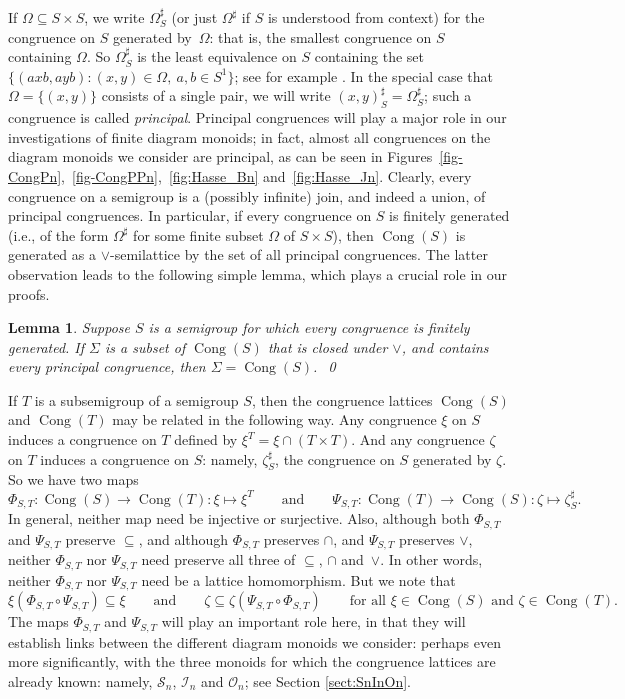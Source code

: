\documentclass[11pt,a4paper]{article}
\renewcommand{\O}{\mathcal O}
\newcommand{\I}{\mathcal I}
\renewcommand{\S}{\mathcal S}
\newcommand{\Om}{\Omega}
\newcommand{\Cong}{\operatorname{Cong}}
\newcommand{\bigset}[2]{\big\{ {#1}: {#2} \big\}}
\newcommand{\cg}[2]{(#1,#2)^\sharp}
\newcommand{\1}{\id_n}
\newcommand{\mt}{\mapsto}
\newcommand{\sub}{\subseteq}
\newcommand{\AND}{\qquad\text{and}\qquad}
\newcommand{\epfres}{\hfill\qed}
\numberwithin{equation}{section}
\newtheorem{lemma}[equation]{Lemma}
\theoremstyle{definition}
\begin{document}
If $\Om\sub S\times S$, we write $\Om^\sharp_S$ (or just $\Om^\sharp$ if $S$ is
understood from context) for the congruence on $S$ generated by~$\Om$: that is,
the smallest congruence on $S$ containing $\Om$.  So $\Om^\sharp_S$ is the
least equivalence on $S$ containing the set $\bigset{(axb,ayb)}{(x,y)\in\Om,\
a,b\in S^1}$; see for example \cite[Section~1.5]{Howie}.  In the special case
that $\Om=\{(x,y)\}$ consists of a single pair, we will write $\cg
xy_S=\Omega^\sharp_S$; such a congruence is called \emph{principal}.
Principal congruences will play a major role in our investigations of finite diagram monoids; in fact, almost all congruences on the diagram monoids we consider are principal, as can be seen in Figures~\ref{fig-CongPn},~\ref{fig-CongPPn},~\ref{fig:Hasse_Bn} and~\ref{fig:Hasse_Jn}.
Clearly, every congruence on a semigroup is a (possibly infinite) join, and indeed a union, of principal congruences.
%
In particular, if every congruence on $S$ is finitely generated (i.e., of the form $\Om^\sharp$ for some finite subset $\Om$ of $S\times S$), then $\Cong(S)$ is generated as a $\vee$-semilattice by the set of all principal congruences.  The latter observation leads to the following simple lemma, which plays a crucial role in our proofs.

\begin{lemma}\label{lem:principal}
Suppose $S$ is a semigroup for which every congruence is finitely generated.  If $\Sigma$ is a subset of $\Cong(S)$ that is closed under $\vee$, and contains every principal congruence, then $\Sigma=\Cong(S)$.~\epfres
\end{lemma}

If $T$ is a subsemigroup of a semigroup $S$, then the congruence lattices $\Cong(S)$ and $\Cong(T)$ may be related in the following way.  Any congruence $\xi$ on $S$ induces a congruence on $T$ defined by $\xi^T=\xi\cap(T\times T)$.  And any congruence $\zeta$ on $T$ induces a congruence on $S$: namely, $\zeta_S^\sharp$, the congruence on $S$ generated by $\zeta$.  So we have two maps
\[
\Phi_{S,T}:\Cong(S)\to\Cong(T):\xi\mt\xi^T \AND \Psi_{S,T}:\Cong(T)\to\Cong(S):\zeta\mt\zeta_S^\sharp.
\]
In general, neither map need be injective or surjective.  Also, although both $\Phi_{S,T}$ and $\Psi_{S,T}$ preserve $\sub$, and although $\Phi_{S,T}$ preserves $\cap$, and $\Psi_{S,T}$ preserves $\vee$, neither $\Phi_{S,T}$ nor $\Psi_{S,T}$ need preserve all three of $\sub$, $\cap$ and~$\vee$.  In other words, neither $\Phi_{S,T}$ nor $\Psi_{S,T}$ need be a lattice homomorphism.  But we note that
\[
\xi(\Phi_{S,T}\circ\Psi_{S,T}) \sub \xi \AND \zeta\sub\zeta(\Psi_{S,T}\circ\Phi_{S,T}) \qquad\text{for all $\xi\in\Cong(S)$ and $\zeta\in\Cong(T)$.}
\]
The maps $\Phi_{S,T}$ and $\Psi_{S,T}$ will play an important role here,
in that they will establish links between the different diagram monoids we consider:
perhaps even more significantly, with the three monoids for which the
congruence lattices are already known: namely, $\S_n$, $\I_n$ and $\O_n$; see
Section \ref{sect:SnInOn}.
\end{document}
